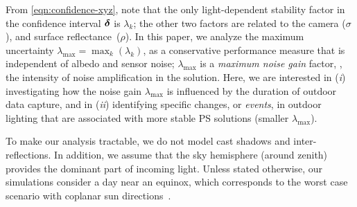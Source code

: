 

From \eqref{eqn:confidence-xyz}, note that the only light-dependent stability factor in the confidence interval $\boldsymbol \delta$ is $\lambda_k$; the other two factors are related to the camera ($\sigma$), and surface reflectance~($\rho$). In this paper, we analyze the maximum uncertainty \mbox{$\lambda_\text{max} = \max_k(\lambda_k)$}, as a conservative performance measure that is independent of albedo and sensor noise; $\lambda_\text{max}$ is a {\em maximum noise gain} factor, \ie, the intensity of noise amplification in the solution. Here, we are interested in (\emph{i}) investigating how the noise gain $\lambda_\text{max}$ is influenced by the duration of outdoor data capture, and in (\emph{ii}) identifying specific changes, or {\em events}, in outdoor lighting that are associated with more stable PS solutions (smaller $\lambda_\text{max}$).

To make our analysis tractable, we do not model cast shadows and inter-reflections. In addition, we assume that the sky hemisphere (around zenith) provides the dominant part of incoming light. Unless stated otherwise, our simulations consider a day near an equinox, which corresponds to the worst case scenario with coplanar sun directions~\cite{shen-pg-14}.


